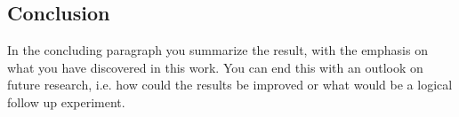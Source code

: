 \subsection{Conclusion}

In the concluding paragraph you summarize the result, with the
emphasis on what you have discovered in this work. You can end this
with an outlook on future research, i.e. how could the results be
improved or what would be a logical follow up experiment.
